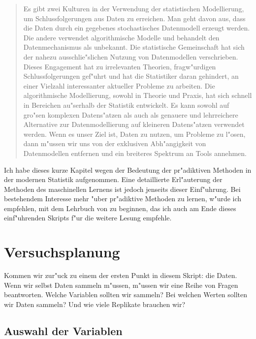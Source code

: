 \documentclass[a4paper,twoside]{tufte-book}\usepackage[]{graphicx}\usepackage[]{color}
\begin{document}
\begin{quote}
Es gibt zwei Kulturen in der Verwendung der statistischen Modellierung, um Schlussfolgerungen aus Daten zu erreichen. Man geht davon aus, dass die Daten durch ein gegebenes stochastisches Datenmodell erzeugt werden. Die andere verwendet algorithmische Modelle und behandelt den Datenmechanismus als unbekannt. Die statistische Gemeinschaft hat sich der nahezu ausschlie"slichen Nutzung von Datenmodellen verschrieben. Dieses Engagement hat zu irrelevanten Theorien, fragw"urdigen Schlussfolgerungen gef"uhrt und hat die Statistiker daran gehindert, an einer Vielzahl interessanter aktueller Probleme zu arbeiten. Die algorithmische Modellierung, sowohl in Theorie und Praxis, hat sich schnell in Bereichen au"serhalb der Statistik entwickelt. Es kann sowohl auf gro"sen komplexen Datens"atzen als auch als genauere und lehrreichere Alternative zur Datenmodellierung auf kleineren Datens"atzen verwendet werden. Wenn es unser Ziel ist, Daten zu nutzen, um Probleme zu l"osen, dann m"ussen wir uns von der exklusiven Abh"angigkeit von Datenmodellen entfernen und ein breiteres Spektrum an Tools annehmen.
\end{quote}


Ich habe dieses kurze Kapitel wegen der Bedeutung der pr"adiktiven Methoden in der modernen Statistik aufgenommen. Eine detaillierte Erl"auterung der Methoden des maschinellen Lernens ist jedoch jenseits dieser Einf"uhrung. Bei bestehendem Interesse mehr "uber pr"adiktive Methoden zu lernen, w"urde ich empfehlen, mit dem Lehrbuch von \citet{James-IntroductiontoStatistical-2013}zu beginnen, das ich auch am Ende dieses einf"uhrenden Skripts f"ur die weitere Lesung empfehle.

\chapter{Versuchsplanung}\label{cha: design of experiments}

Kommen wir zur"uck zu einem der ersten Punkt in diesem Skript: die Daten. Wenn wir selbst Daten sammeln m"ussen, m"ussen wir eine Reihe von Fragen beantworten. Welche Variablen sollten wir sammeln? Bei welchen Werten sollten wir Daten sammeln? Und wie viele Replikate brauchen wir?


\section{Auswahl der Variablen}
\end{document}
